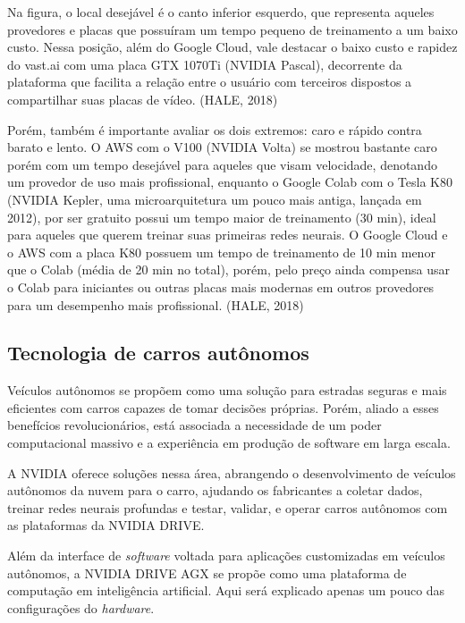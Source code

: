 \documentclass[letterpaper, 10 pt, conference]{ieeeconf}  %
\begin{document}
Na figura, o local desejável é o canto inferior esquerdo, que representa aqueles provedores e placas que possuíram um tempo pequeno de treinamento a um baixo custo. Nessa posição, além do Google Cloud, vale destacar o baixo custo e rapidez do vast.ai com uma placa GTX 1070Ti (NVIDIA Pascal), decorrente da plataforma que facilita a relação entre o usuário com terceiros dispostos a compartilhar suas placas de vídeo. (HALE, 2018)

Porém, também é importante avaliar os dois extremos: caro e rápido contra barato e lento. O AWS com o V100 (NVIDIA Volta) se mostrou bastante caro porém com um tempo desejável para aqueles que visam velocidade, denotando um provedor de uso mais profissional, enquanto o Google Colab com o Tesla K80 (NVIDIA Kepler, uma microarquitetura um pouco mais antiga, lançada em 2012), por ser gratuito possui um tempo maior de treinamento (30 min), ideal para aqueles que querem treinar suas primeiras redes neurais. O Google Cloud e o AWS com a placa K80 possuem um tempo de treinamento de 10 min menor que o Colab (média de 20 min no total), porém, pelo preço ainda compensa usar o Colab para iniciantes ou outras placas mais modernas em outros provedores para um desempenho mais profissional. (HALE, 2018) 

\subsection{Tecnologia de carros autônomos}

Veículos autônomos se propõem como uma solução para estradas seguras e mais eficientes com carros capazes de tomar decisões próprias. Porém, aliado a esses benefícios revolucionários, está associada a necessidade de um poder computacional massivo e a experiência em produção de software em larga escala.

A NVIDIA oferece soluções nessa área, abrangendo o desenvolvimento de veículos autônomos da nuvem para o carro, ajudando os fabricantes a coletar dados, treinar redes neurais profundas e testar, validar, e operar carros autônomos com as plataformas da NVIDIA DRIVE. 

Além da interface de \textit{software} voltada para aplicações customizadas em veículos autônomos, a NVIDIA DRIVE AGX se propõe como uma plataforma de computação em inteligência artificial. Aqui será explicado apenas um pouco das configurações do \textit{hardware}.
\end{document}
